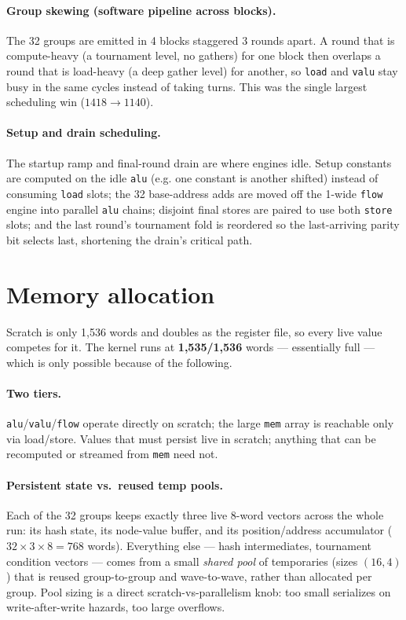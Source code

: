 \documentclass[11pt]{article}
\newcommand{\code}[1]{\texttt{#1}}
\begin{document}
\paragraph{Group skewing (software pipeline across blocks).} The 32 groups
are emitted in 4 blocks staggered 3 rounds apart. A round that is
compute-heavy (a tournament level, no gathers) for one block then overlaps a
round that is load-heavy (a deep gather level) for another, so
\code{load} and \code{valu} stay busy in the same cycles instead of taking
turns. This was the single largest scheduling win
($1418\!\to\!1140$).

\paragraph{Setup and drain scheduling.} The startup ramp and final-round
drain are where engines idle. Setup constants are computed on the idle
\code{alu} (e.g. one constant is another shifted) instead of consuming
\code{load} slots; the 32 base-address adds are moved off the 1-wide
\code{flow} engine into parallel \code{alu} chains; disjoint final stores are
paired to use both \code{store} slots; and the last round's tournament fold
is reordered so the last-arriving parity bit selects last, shortening the
drain's critical path.

\section{Memory allocation}

Scratch is only 1{,}536 words and doubles as the register file, so every live
value competes for it. The kernel runs at \textbf{1{,}535/1{,}536} words ---
essentially full --- which is only possible because of the following.

\paragraph{Two tiers.} \code{alu}/\code{valu}/\code{flow} operate directly on
scratch; the large \code{mem} array is reachable only via load/store. Values
that must persist live in scratch; anything that can be recomputed or streamed
from \code{mem} need not.

\paragraph{Persistent state vs.\ reused temp pools.} Each of the 32 groups
keeps exactly three live 8-word vectors across the whole run: its hash state,
its node-value buffer, and its position/address accumulator ($32\times3\times
8 = 768$ words). Everything else --- hash intermediates, tournament condition
vectors --- comes from a small \emph{shared pool} of temporaries (sizes
$(16,4)$) that is reused group-to-group and wave-to-wave, rather than
allocated per group. Pool sizing is a direct scratch-vs-parallelism knob:
too small serializes on write-after-write hazards, too large overflows.
\end{document}
